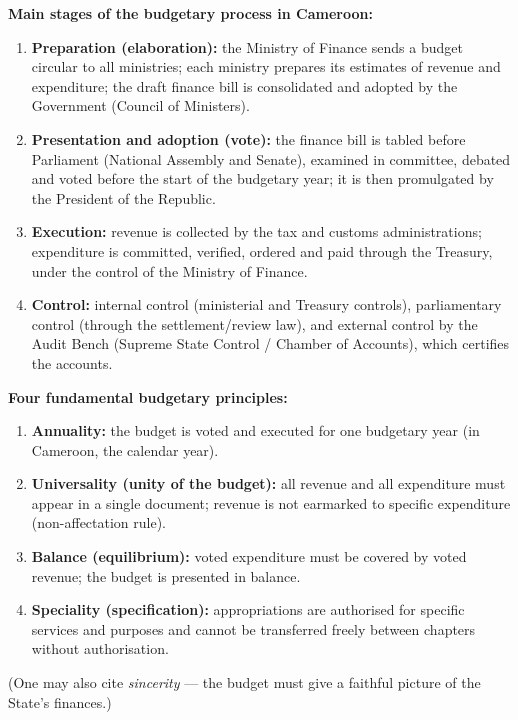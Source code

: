 \documentclass[11pt]{article}
\begin{document}
\begin{corrige}
\textbf{Main stages of the budgetary process in Cameroon:}
\begin{enumerate}
\item \textbf{Preparation (elaboration):} the Ministry of Finance sends a budget circular to all ministries; each ministry prepares its estimates of revenue and expenditure; the draft finance bill is consolidated and adopted by the Government (Council of Ministers).
\item \textbf{Presentation and adoption (vote):} the finance bill is tabled before Parliament (National Assembly and Senate), examined in committee, debated and voted before the start of the budgetary year; it is then promulgated by the President of the Republic.
\item \textbf{Execution:} revenue is collected by the tax and customs administrations; expenditure is committed, verified, ordered and paid through the Treasury, under the control of the Ministry of Finance.
\item \textbf{Control:} internal control (ministerial and Treasury controls), parliamentary control (through the settlement/review law), and external control by the Audit Bench (Supreme State Control / Chamber of Accounts), which certifies the accounts.
\end{enumerate}

\textbf{Four fundamental budgetary principles:}
\begin{enumerate}
\item \textbf{Annuality:} the budget is voted and executed for one budgetary year (in Cameroon, the calendar year).
\item \textbf{Universality (unity of the budget):} all revenue and all expenditure must appear in a single document; revenue is not earmarked to specific expenditure (non-affectation rule).
\item \textbf{Balance (equilibrium):} voted expenditure must be covered by voted revenue; the budget is presented in balance.
\item \textbf{Speciality (specification):} appropriations are authorised for specific services and purposes and cannot be transferred freely between chapters without authorisation.
\end{enumerate}
(One may also cite \emph{sincerity} — the budget must give a faithful picture of the State's finances.)
\end{corrige}
\end{document}

